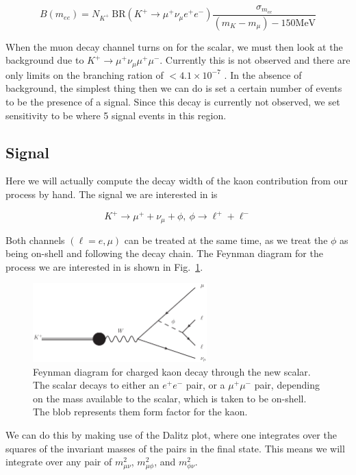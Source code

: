 \begin{equation}
B(m_{ee}) = N_{K^+}~\textrm{BR}(K^+ \rightarrow \mu^+ \nu_\mu e^+ e^-) \frac{\sigma_{m_{ee}}}{(m_K - m_\mu) - 150\textrm{MeV}}
\end{equation}

When the muon decay channel turns on for the scalar, we must then look at the background due to $K^+ \rightarrow \mu^+ \nu_\mu \mu^+ \mu^-$.
Currently this is not observed and there are only limits on the branching ration of $< 4.1 \times 10^{-7}$ \cite{Agashe:2014kda}.
In the absence of background, the simplest thing then we can do is set a certain number of events to be the presence of a signal.
Since this decay is currently not observed, we set sensitivity to be where 5 signal events in this region.

\subsection{Signal}
Here we will actually compute the decay width of the kaon contribution from our process by hand.
The signal we are interested in is

\begin{equation}
    K^+ \rightarrow \mu^+ + \nu_\mu + \phi,~\phi \rightarrow \ell^+ + \ell^-
\end{equation}

\noindent Both channels $(\ell = e, \mu)$ can be treated at the same time, as we treat the $\phi$ as being on-shell and following the decay chain.
The Feynman diagram for the process we are interested in is shown in Fig.\ \ref{fig:kaon_decay_signal}.

\begin{figure}[h]
    \centering
    \includegraphics[width=0.6\textwidth]{Figures/feynman_diagrams/k_munull_scalar}
    \caption{Feynman diagram for charged kaon decay through the new scalar. The scalar decays to either an $e^+ e^-$ pair, or a $\mu^+ \mu^-$ pair, depending on the mass available to the scalar, which is taken to be on-shell. The blob represents them form factor for the kaon.}
    \label{fig:kaon_decay_signal}
\end{figure}

We can do this by making use of the Dalitz plot, where one integrates over the squares of the invariant masses of the pairs in the final state.
This means we will integrate over any pair of $m_{\mu\nu}^2$, $m_{\mu\phi}^2$, and $m_{\phi\nu}^2$.
